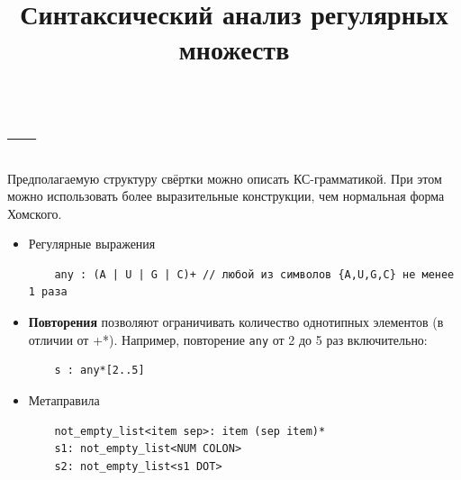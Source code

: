 \documentclass[a5paper]{article}
\title{Синтаксический анализ регулярных множеств}
\begin{document}




\section*{---}

Предполагаемую структуру свёртки можно описать КС-грамматикой. При этом можно использовать более выразительные конструкции, чем нормальная форма Хомского.

\begin{itemize}
    \item Регулярные выражения
        \begin{verbatim}
    any : (A | U | G | C)+ // любой из символов {A,U,G,C} не менее 1 раза
        \end{verbatim}
    \item \textbf{Повторения} позволяют ограничивать количество однотипных элементов (в отличии от +*). Например, повторение \texttt{any} от 2 до 5 раз включительно:
        \begin{verbatim}
    s : any*[2..5] 
        \end{verbatim}
    \item Метаправила
        \begin{verbatim}
    not_empty_list<item sep>: item (sep item)*
    s1: not_empty_list<NUM COLON>
    s2: not_empty_list<s1 DOT>
        \end{verbatim}
\end{itemize}
\end{document}
